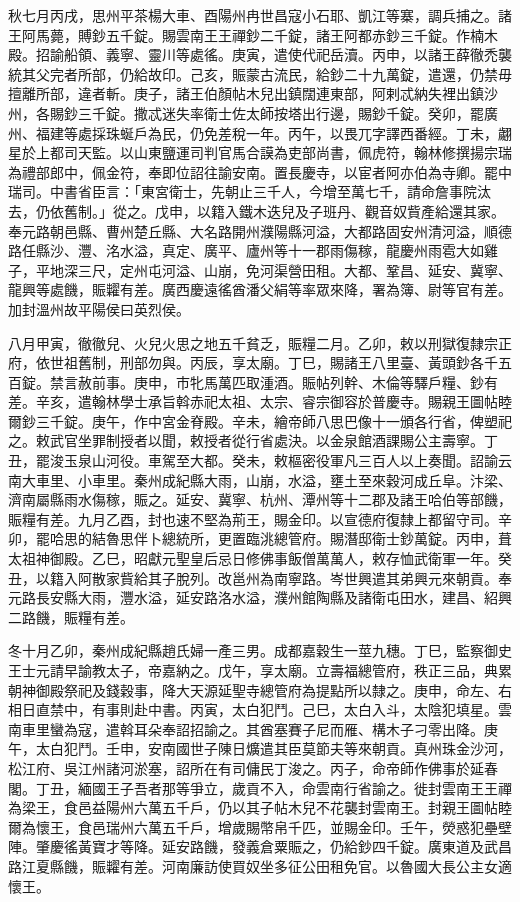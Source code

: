 \begin{pinyinscope}
 秋七月丙戌，思州平茶楊大車、酉陽州冉世昌寇小石耶、凱江等寨，調兵捕之。諸王阿馬薨，賻鈔五千錠。賜雲南王王禪鈔二千錠，諸王阿都赤鈔三千錠。作楠木殿。招諭船領、義寧、靈川等處徭。庚寅，遣使代祀岳瀆。丙申，以諸王薛徹禿襲統其父完者所部，仍給故印。己亥，賑蒙古流民，給鈔二十九萬錠，遣還，仍禁毋擅離所部，違者斬。庚子，諸王伯顏帖木兒出鎮闊連東部，阿剌忒納失裡出鎮沙州，各賜鈔三千錠。撒忒迷失率衛士佐太師按塔出行邊，賜鈔千錠。癸卯，罷廣州、福建等處採珠蜒戶為民，仍免差稅一年。丙午，以畏兀字譯西番經。丁未，翽星於上都司天監。以山東鹽運司判官馬合謨為吏部尚書，佩虎符，翰林修撰揚宗瑞為禮部郎中，佩金符，奉即位詔往諭安南。置長慶寺，以宦者阿亦伯為寺卿。罷中瑞司。中書省臣言：「東宮衛士，先朝止三千人，今增至萬七千，請命詹事院汰去，仍依舊制。」從之。戊申，以籍入鐵木迭兒及子班丹、觀音奴貲產給還其家。奉元路朝邑縣、曹州楚丘縣、大名路開州濮陽縣河溢，大都路固安州清河溢，順德路任縣沙、灃、洺水溢，真定、廣平、廬州等十一郡雨傷稼，龍慶州雨雹大如雞子，平地深三尺，定州屯河溢、山崩，免河渠營田租。大都、鞏昌、延安、冀寧、龍興等處饑，賑糶有差。廣西慶遠徭酋潘父絹等率眾來降，署為簿、尉等官有差。加封溫州故平陽侯曰英烈侯。



 八月甲寅，徹徹兒、火兒火思之地五千貧乏，賑糧二月。乙卯，敕以刑獄復隸宗正府，依世祖舊制，刑部勿與。丙辰，享太廟。丁巳，賜諸王八里臺、黃頭鈔各千五百錠。禁言赦前事。庚申，市牝馬萬匹取湩酒。賑帖列幹、木倫等驛戶糧、鈔有差。辛亥，遣翰林學士承旨斡赤祀太祖、太宗、睿宗御容於普慶寺。賜親王圖帖睦爾鈔三千錠。庚午，作中宮金脊殿。辛未，繪帝師八思巴像十一頒各行省，俾塑祀之。敕武官坐罪制授者以聞，敕授者從行省處決。以金泉館酒課賜公主壽寧。丁丑，罷浚玉泉山河役。車駕至大都。癸未，敕樞密役軍凡三百人以上奏聞。詔諭云南大車里、小車里。秦州成紀縣大雨，山崩，水溢，壅土至來穀河成丘阜。汴梁、濟南屬縣雨水傷稼，賑之。延安、冀寧、杭州、潭州等十二郡及諸王哈伯等部饑，賑糧有差。九月乙酉，封也速不堅為荊王，賜金印。以宣德府復隸上都留守司。辛卯，罷哈思的結魯思伴卜總統所，更置臨洮總管府。賜潛邸衛士鈔萬錠。丙申，葺太祖神御殿。乙巳，昭獻元聖皇后忌日修佛事飯僧萬萬人，敕存恤武衛軍一年。癸丑，以籍入阿散家貲給其子脫列。改邕州為南寧路。岑世興遣其弟興元來朝貢。奉元路長安縣大雨，灃水溢，延安路洛水溢，濮州館陶縣及諸衛屯田水，建昌、紹興二路饑，賑糧有差。



 冬十月乙卯，秦州成紀縣趙氏婦一產三男。成都嘉穀生一莖九穗。丁巳，監察御史王士元請早諭教太子，帝嘉納之。戊午，享太廟。立壽福總管府，秩正三品，典累朝神御殿祭祀及錢穀事，降大天源延聖寺總管府為提點所以隸之。庚申，命左、右相日直禁中，有事則赴中書。丙寅，太白犯鬥。己巳，太白入斗，太陰犯填星。雲南車里蠻為寇，遣斡耳朵奉詔招諭之。其酋塞賽子尼而雁、構木子刁零出降。庚午，太白犯鬥。壬申，安南國世子陳日爌遣其臣莫節夫等來朝貢。真州珠金沙河，松江府、吳江州諸河淤塞，詔所在有司傭民丁浚之。丙子，命帝師作佛事於延春閣。丁丑，緬國王子吾者那等爭立，歲貢不入，命雲南行省諭之。徙封雲南王王禪為梁王，食邑益陽州六萬五千戶，仍以其子帖木兒不花襲封雲南王。封親王圖帖睦爾為懷王，食邑瑞州六萬五千戶，增歲賜幣帛千匹，並賜金印。壬午，熒惑犯壘壁陣。肇慶徭黃寶才等降。延安路饑，發義倉粟賑之，仍給鈔四千錠。廣東道及武昌路江夏縣饑，賑糶有差。河南廉訪使買奴坐多征公田租免官。以魯國大長公主女適懷王。




\end{pinyinscope}
